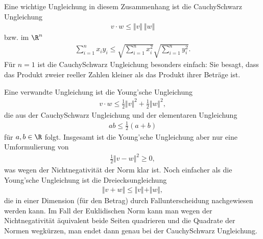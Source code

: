 \documentclass[letterpaper,10pt,english]{jupyterBook}
\begin{document}
Eine wichtige Ungleichung in diesem Zusammenhang ist die Cauchy\sphinxhyphen{}Schwarz Ungleichung
\begin{equation*}
\begin{split} v \cdot w \leq \Vert v \Vert~ \Vert w  \Vert\end{split}
\end{equation*}
bzw. im \(\R^n\)
\begin{equation*}
\begin{split} \sum_{i=1}^n x_i y_i \leq \sqrt{\sum_{i=1}^n x_i^2} \sqrt{\sum_{i=1}^n y_i^2} .\end{split}
\end{equation*}
Für \(n=1\) ist die Cauchy\sphinxhyphen{}Schwarz Ungleichung besonders einfach: Sie besagt, dass das Produkt zweier reeller Zahlen kleiner als das Produkt ihrer Beträge ist.

Eine verwandte Ungleichung ist die Young’sche Ungleichung
\begin{equation*}
\begin{split}  v \cdot w \leq \frac{1}2 \Vert v \Vert^2 + \frac{1}2\Vert w  \Vert^2, \end{split}
\end{equation*}
die aus der Cauchy\sphinxhyphen{}Schwarz Ungleichung und der elementaren Ungleichung
\begin{equation*}
\begin{split} ab \leq \frac{1}2 (a+b) \end{split}
\end{equation*}
für \(a,b \in \R\) folgt. Insgesamt ist die Young’sche Ungleichung aber nur eine Umformulierung von
\begin{equation*}
\begin{split} \frac{1}2 \Vert v - w \Vert^2 \geq 0, \end{split}
\end{equation*}
was wegen der Nichtnegativität der Norm klar ist. Noch einfacher als die Young’sche Ungleichung ist die Dreiecksungleichung
\begin{equation*}
\begin{split} \Vert v + w\Vert \leq \Vert v \Vert + \Vert w \Vert, \end{split}
\end{equation*}
die in einer Dimension (für den Betrag) durch Fallunterscheidung nachgewiesen werden kann. Im Fall der Euklidischen Norm kann man wegen der Nichtnegativität äquivalent beide Seiten quadrieren und die Quadrate der Normen wegkürzen, man endet dann genau bei der Cauchy\sphinxhyphen{}Schwarz Ungleichung.
\end{document}
